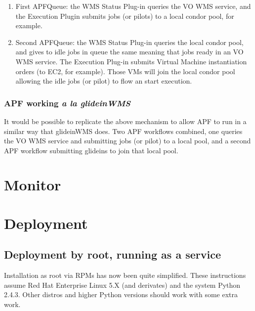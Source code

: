 \documentclass[a4paper]{jpconf}
\begin{document}
\begin{enumerate}
\item First APFQueue: 
the WMS Status Plug-in queries the VO WMS service, and the Execution Plugin submits jobs (or pilots) to a local condor pool, for example.
\item Second APFQueue: 
the WMS Status Plug-in queries the local condor pool, 
and gives to idle jobs in queue the same meaning that jobs ready in an VO WMS service. 
The Execution Plug-in submits Virtual Machine instantiation orders (to EC2, for example). 
Those VMs will join the local condor pool allowing the idle jobs (or pilot) to flow an start execution. 
\end{enumerate}

\subsubsection{APF working \emph{a la glideinWMS}}

It would be possible to replicate the above mechanism to allow APF to run in a similar way that glideinWMS does. 
Two APF workflows combined, one queries the VO WMS service and submitting jobs (or pilot) to a local pool, 
and a second APF workflow submitting glideins to join that local pool. 

\section{Monitor}

\section{Deployment}

\subsection{Deployment by root, running as a service}

Installation as root via RPMs has now been quite simplified. 
These instructions assume Red Hat Enterprise Linux 5.X (and derivates) and the system Python 2.4.3. 
Other distros and higher Python versions should work with some extra work.
\end{document}
